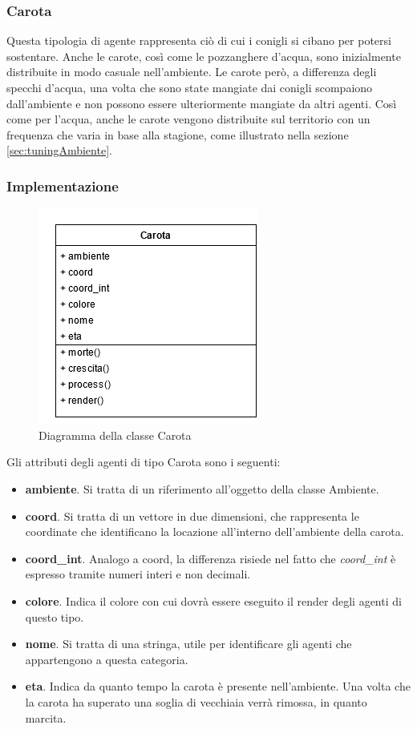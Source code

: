 \documentclass[11pt]{article}
\begin{document}
\subsubsection{Carota}
Questa tipologia di agente rappresenta ciò di cui i conigli si cibano per potersi sostentare. Anche le carote, così come le pozzanghere d'acqua, sono inizialmente distribuite in modo casuale nell'ambiente. Le carote però, a differenza degli specchi d'acqua, una volta che sono state mangiate dai conigli scompaiono dall'ambiente e non possono essere ulteriormente mangiate da altri agenti. Così come per l'acqua, anche le carote vengono distribuite sul territorio con un frequenza che varia in base alla stagione, come illustrato nella sezione \ref{sec:tuningAmbiente}. 

\subsubsection{Implementazione}

\begin{figure}[h!]
     \centering
     \includegraphics[scale = 0.7]{Carota.png}
     \caption{Diagramma della classe Carota}
     \label{fig:carotaUML}
\end{figure}
 Gli attributi degli agenti di tipo Carota sono i seguenti: 
\begin{itemize}
    \item \textbf{ambiente}. Si tratta di un riferimento all'oggetto della classe Ambiente. 
    \item \textbf{coord}. Si tratta di un vettore in due dimensioni, che rappresenta le coordinate che identificano la locazione all'interno dell'ambiente della carota. 
    \item \textbf{coord\_int}. Analogo a coord, la differenza risiede nel fatto che \emph{coord\_int} è espresso tramite numeri interi e non decimali. 
    \item \textbf{colore}. Indica il colore con cui dovrà essere eseguito il render degli agenti di questo tipo.
    \item \textbf{nome}. Si tratta di una stringa, utile per identificare gli agenti che appartengono a questa categoria. 
    \item \textbf{eta}. Indica da quanto tempo la carota è presente nell'ambiente. Una volta che la carota ha superato una soglia di vecchiaia verrà rimossa, in quanto marcita. 
\end{itemize}
\end{document}

